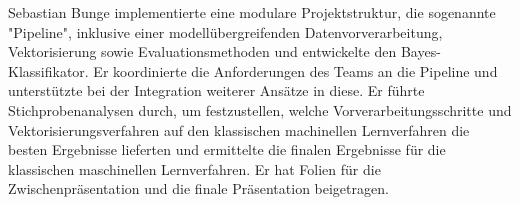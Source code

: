 \label{sec:sebastian}
Sebastian Bunge implementierte eine modulare Projektstruktur, die sogenannte "Pipeline", inklusive einer modellübergreifenden Datenvorverarbeitung, Vektorisierung sowie Evaluationsmethoden und entwickelte den Bayes-Klassifikator. Er koordinierte die Anforderungen des Teams an die Pipeline und unterstützte bei der Integration weiterer Ansätze in diese. Er führte Stichprobenanalysen durch, um festzustellen, welche Vorverarbeitungsschritte und Vektorisierungsverfahren auf den klassischen machinellen Lernverfahren die besten Ergebnisse lieferten und ermittelte die finalen Ergebnisse für die klassischen maschinellen Lernverfahren. Er hat Folien für die Zwischenpräsentation und die finale Präsentation beigetragen.

